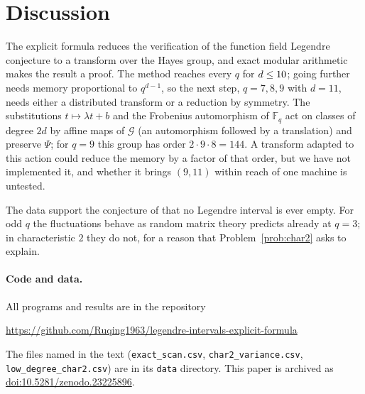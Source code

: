 \documentclass[11pt,a4paper]{article}
\theoremstyle{definition}
\theoremstyle{remark}
\newcommand{\Fq}{\mathbb{F}_q}
\newcommand{\cG}{\mathcal{G}}
\begin{document}
\section{Discussion}

The explicit formula reduces the verification of the function field Legendre conjecture to a
transform over the Hayes group, and exact modular arithmetic makes the result a proof. The method
reaches every $q$ for $d\le10$; going further needs memory proportional to $q^{d-1}$, so the next step,
$q=7,8,9$ with $d=11$, needs either a distributed transform or a reduction by symmetry. The substitutions
$t\mapsto\lambda t+b$ and the Frobenius automorphism of $\Fq$ act on classes of degree $2d$ by affine maps of
$\cG$ (an automorphism followed by a translation) and preserve $\Psi$; for $q=9$ this group has order
$2\cdot9\cdot8=144$. A transform adapted to this action could reduce the memory by a factor of that order,
but we have not implemented it, and whether it brings $(9,11)$ within reach of one machine is untested.

The data support the conjecture of \cite{ChenV7} that no Legendre interval is ever empty. For odd $q$ the
fluctuations behave as random matrix theory predicts already at $q=3$; in characteristic $2$ they do not,
for a reason that Problem~\ref{prob:char2} asks to explain.

\paragraph{Code and data.} All programs and results are in the repository
\begin{center}\small\url{https://github.com/Ruqing1963/legendre-intervals-explicit-formula}\end{center}
The files named in the text (\texttt{exact\_scan.csv}, \texttt{char2\_variance.csv},
\texttt{low\_degree\_char2.csv}) are in its \texttt{data} directory. This paper is archived as
\href{https://doi.org/10.5281/zenodo.23225896}{doi:10.5281/zenodo.23225896}.
\end{document}
